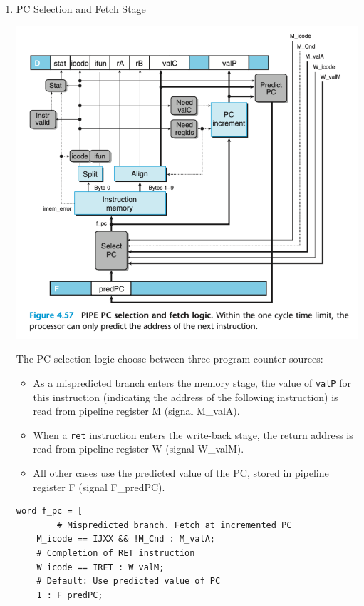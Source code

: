 \documentclass[11pt]{article}
\begin{document}
\begin{enumerate}
\item PC Selection and Fetch Stage
\label{sec:org543efa1}

\begin{center}
\includegraphics[width=.9\linewidth]{pics/figure4.57-pipe-pc-selection-and-fetch-logic.png}
\end{center}

The PC selection logic choose between three program counter sources:\\
\begin{itemize}
\item As a mispredicted branch enters the memory stage, the value of \texttt{valP} for this instruction (indicating the address of the following instruction) is read from pipeline register M (signal M\_valA).\\
\item When a \texttt{ret} instruction enters the write-back stage, the return address is read from pipeline register W (signal W\_valM).\\
\item All other cases use the predicted value of the PC, stored in pipeline register F (signal F\_predPC).\\
\end{itemize}

\begin{verbatim}
word f_pc = [
        # Mispredicted branch. Fetch at incremented PC
	M_icode == IJXX && !M_Cnd : M_valA;
	# Completion of RET instruction
	W_icode == IRET : W_valM;
	# Default: Use predicted value of PC
	1 : F_predPC;
\end{verbatim}


\end{enumerate}
\end{document}

